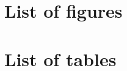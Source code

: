 \renewcommand{\listfigurename}{}
\renewcommand{\listtablename}{}
\section{List of figures}

\listoffigures

\section{List of tables}

\listoftables
